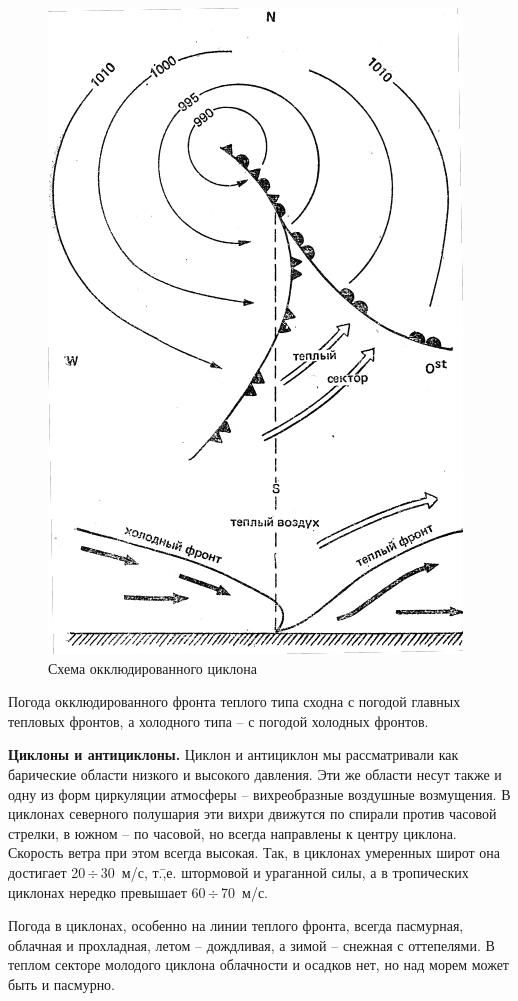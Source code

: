 \documentclass[a4paper, 12pt, twoside, final, book, russian, fittopage, cyremdash]{ncc}
\newcommand{\otdo}{\,\ensuremath{\div}\,}
\begin{document}
\begin{figure}[htb]
  \centering{}
  \includegraphics[scale=1.2]{0123P}
  \caption{Схема окклюдированного циклона}
  \label{fig:123}
\end{figure}

Погода окклюдированного фронта теплого типа сходна с погодой главных тепловых фронтов, а холодного типа \--- с погодой холодных фронтов.

\textbf{Циклоны и антициклоны.} Циклон и антициклон мы рассматривали как барические области низкого и высокого давления. Эти же области несут также и одну из форм циркуляции атмосферы \--- вихреобразные воздушные возмущения. В циклонах северного полушария эти вихри движутся по спирали против часовой стрелки, в южном \--- по часовой, но всегда направлены к центру циклона. Скорость ветра при этом всегда высокая. Так, в циклонах умеренных широт она достигает 20\otdo 30~м/с, т.\=,е. штормовой и ураганной силы, а в тропических циклонах нередко превышает 60\otdo 70~м/с.

Погода в циклонах, особенно на линии теплого фронта, всегда пасмурная, облачная и прохладная, летом \--- дождливая, а зимой \--- снежная с оттепелями. В теплом секторе молодого циклона облачности и осадков нет, но над морем может быть и пасмурно.
\end{document}
